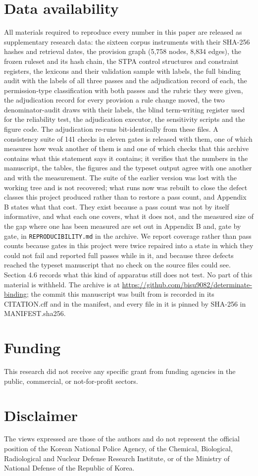 \section*{Data availability}
All materials required to reproduce every number in this paper are released as supplementary research data: the sixteen corpus instruments with their SHA-256 hashes and retrieval dates, the provision graph (5,758 nodes, 8,834 edges), the frozen ruleset and its hash chain, the STPA control structures and constraint registers, the lexicons and their validation sample with labels, the full binding audit with the labels of all three passes and the adjudication record of each, the permission-type classification with both passes and the rubric they were given, the adjudication record for every provision a rule change moved, the two denominator-audit draws with their labels, the blind term-writing register used for the reliability test, the adjudication executor, the sensitivity scripts and the figure code. The adjudication re-runs bit-identically from these files. A consistency suite of 141 checks in eleven gates is released with them, one of which measures how weak another of them is and one of which checks that this archive contains what this statement says it contains; it verifies that the numbers in the manuscript, the tables, the figures and the typeset output agree with one another and with the measurement. The suite of the earlier version was lost with the working tree and is not recovered; what runs now was rebuilt to close the defect classes this project produced rather than to restore a pass count, and Appendix B states what that cost. They exist because a pass count was not by itself informative, and what each one covers, what it does not, and the measured size of the gap where one has been measured are set out in Appendix B and, gate by gate, in \texttt{REPRODUCIBILITY.md} in the archive. We report coverage rather than pass counts because gates in this project were twice repaired into a state in which they could not fail and reported full passes while in it, and because three defects reached the typeset manuscript that no check on the source files could see. Section 4.6 records what this kind of apparatus still does not test. No part of this material is withheld. The archive is at \url{https://github.com/bisu9082/determinate-binding}; the commit this manuscript was built from is recorded in its CITATION.cff and in the manifest, and every file in it is pinned by SHA-256 in MANIFEST.sha256.

\section*{Funding}
This research did not receive any specific grant from funding agencies in the public, commercial, or not-for-profit sectors.

\section*{Disclaimer}
The views expressed are those of the authors and do not represent the official position of the Korean National Police Agency, of the Chemical, Biological, Radiological and Nuclear Defense Research Institute, or of the Ministry of National Defense of the Republic of Korea.

